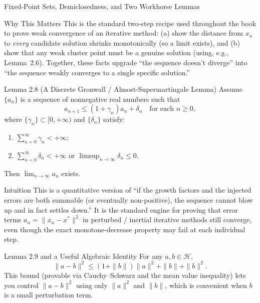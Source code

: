 \documentclass[aspectratio=169,10pt]{beamer}
\begin{document}
\begin{frame}[allowframebreaks]{Fixed-Point Sets, Demiclosedness, and Two Workhorse Lemmas}
  \begin{block}{Why This Matters}
    This is the standard two-step recipe used throughout the book to prove
    weak convergence of an iterative method: (a) show the distance from
    $x_n$ to \emph{every} candidate solution shrinks monotonically (so a
    limit exists), and (b) show that any weak cluster point must be a
    genuine solution (using, e.g., Lemma~2.6). Together, these facts upgrade
    ``the sequence doesn't diverge'' into ``the sequence weakly converges to
    a single specific solution.''
  \end{block}

  \framebreak

  \begin{block}{Lemma 2.8 (A Discrete Gronwall / Almost-Supermartingale Lemma)}
    Assume $\{a_n\}$ is a sequence of nonnegative real numbers such that
    \[
      a_{n+1} \le (1+\gamma_n)a_n + \delta_n \quad \text{for each } n \ge 0,
    \]
    where $\{\gamma_n\} \subset [0,+\infty)$ and $\{\delta_n\}$ satisfy:
    \begin{enumerate}
      \item[(a)] $\sum_{n=0}^{\infty}\gamma_n < +\infty$;
      \item[(b)] $\sum_{n=0}^{\infty}\delta_n < +\infty$ \; or \;
        $\limsup_{n\to\infty}\delta_n \le 0$.
    \end{enumerate}
    Then $\lim_{n\to\infty} a_n$ exists.
  \end{block}

  \begin{block}{Intuition}
    This is a quantitative version of ``if the growth factors and the
    injected errors are both summable (or eventually non-positive), the
    sequence cannot blow up and in fact settles down.'' It is the standard
    engine for proving that error terms $a_n = \|x_n - x^*\|^2$ in
    perturbed / inertial iterative methods still converge, even though the
    exact monotone-decrease property may fail at each individual step.
  \end{block}

  \framebreak

  \begin{block}{Lemma 2.9 and a Useful Algebraic Identity}
    For any $a, b \in \mathcal{H}$,
    \[
      \|a-b\|^2 \le (1+\|b\|)\|a\|^2 + \|b\| + \|b\|^2.
    \]
    This bound (provable via Cauchy--Schwarz and the mean value inequality)
    lets you control $\|a-b\|^2$ using only $\|a\|^2$ and $\|b\|$, which is
    convenient when $b$ is a small perturbation term.


\end{block}
\end{frame}
\end{document}
